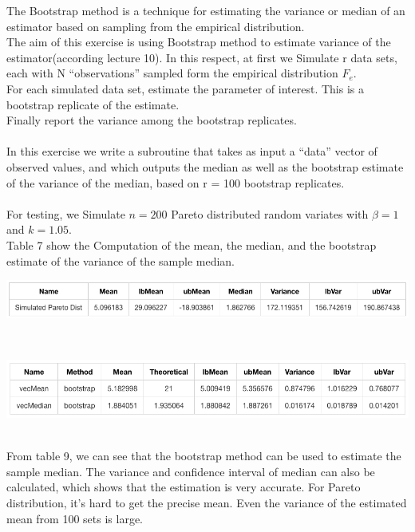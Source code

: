 The Bootstrap method is a technique for estimating the variance or median of an estimator based on sampling from the empirical distribution.\\
The aim of this exercise is using Bootstrap method to estimate variance of the estimator(according lecture 10). In this respect, at first we Simulate r  data sets, each with N “observations” sampled form the empirical distribution $F_e$.\\
For each simulated data set, estimate the parameter of interest. This is a bootstrap replicate of the estimate.\\
Finally report the variance among the bootstrap replicates.\\
\\In this exercise we write a subroutine that takes as input a “data” vector of observed values, and which outputs the median as well as the bootstrap estimate of the variance of the median, based on r = 100 bootstrap replicates.\\
\\For testing, we Simulate $n = 200$ Pareto distributed random variates with $\beta = 1$ and $k = 1.05$.\\
Table 7 show the Computation of the mean, the median, and the bootstrap estimate of the variance of the sample median.

\begin{center}
    \includegraphics[scale=0.5]{Figures/figure8_2.png}\\
\end{center}\\

\begin{center}
    \includegraphics[scale=0.55]{Figures/figure8_1.png}\\
\end{center}\\

From table 9, we can see that the bootstrap method can be used to estimate the sample median. The variance and confidence interval of median can also be calculated, which shows that the estimation is very accurate. For Pareto distribution, it's hard to get the precise mean. Even the variance of the estimated mean from 100 sets is large.